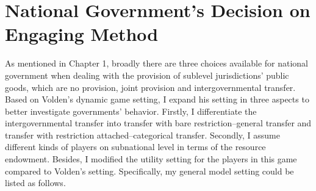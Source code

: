 




\section{National Government's Decision on Engaging Method}
As mentioned in Chapter 1, broadly there are three choices available for national government when dealing with the provision of sublevel jurisdictions' public goods, which are no provision, joint provision and intergovernmental transfer. Based on Volden's \cite{volden2007intergovernmental} dynamic game setting, I expand his setting in three aspects to better investigate governments' behavior. Firstly, I differentiate the intergovernmental transfer into transfer with bare restriction--general transfer and transfer with restriction attached--categorical transfer. Secondly, I assume different kinds of players on subnational level in terms of the resource endowment. Besides, I modified the utility setting for the players in this game compared to Volden's setting. Specifically, my general model setting could be listed as follows.

